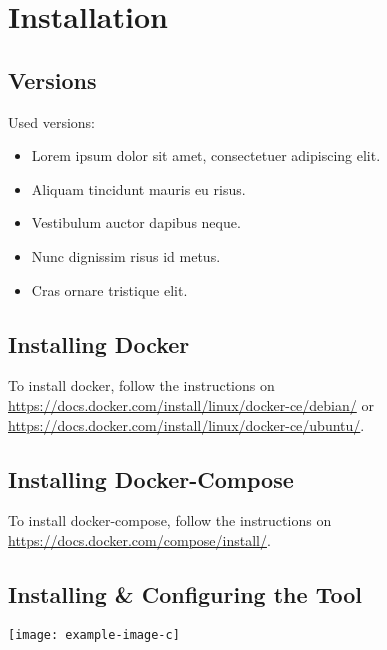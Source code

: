 \chapter{Installation}
\section{Versions}
Used versions:
\begin{itemize}
	\item Lorem ipsum dolor sit amet, consectetuer adipiscing elit.
	\item Aliquam tincidunt mauris eu risus.
	\item Vestibulum auctor dapibus neque.
	\item Nunc dignissim risus id metus.
	\item Cras ornare tristique elit.
\end{itemize}

\section{Installing Docker}
To install docker, follow the instructions on \url{https://docs.docker.com/install/linux/docker-ce/debian/} or \url{https://docs.docker.com/install/linux/docker-ce/ubuntu/}.

\section{Installing Docker-Compose}
To install docker-compose, follow the instructions on \url{https://docs.docker.com/compose/install/}.

\section{Installing \& Configuring the Tool}
\lipsum[3]

\noindent\texttt{[image: example-image-c]} 